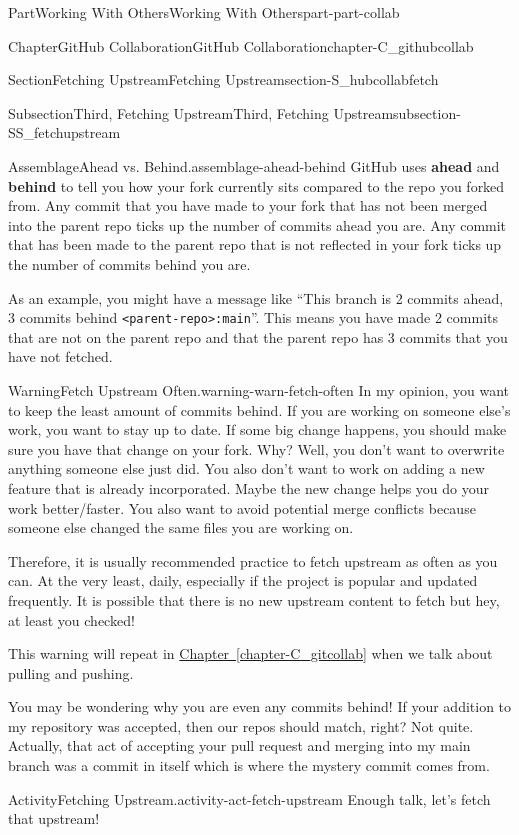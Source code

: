 \documentclass[oneside,10pt,]{book}
\newcommand{\xreffont}{\relax}
\newcommand{\mono}[1]{\texttt{#1}}
\newcommand{\terminology}[1]{\textbf{#1}}
\begin{document}
\begin{partptx}{Part}{Working With Others}{}{Working With Others}{}{}{part-part-collab}
\begin{chapterptx}{Chapter}{GitHub Collaboration}{}{GitHub Collaboration}{}{}{chapter-C_githubcollab}
\begin{sectionptx}{Section}{Fetching Upstream}{}{Fetching Upstream}{}{}{section-S_hubcollabfetch}
\begin{subsectionptx}{Subsection}{Third, Fetching Upstream}{}{Third, Fetching Upstream}{}{}{subsection-SS_fetchupstream}
\begin{assemblage}{Assemblage}{Ahead vs. Behind.}{assemblage-ahead-behind}%
GitHub uses \terminology{ahead} and \terminology{behind} to tell you how your fork currently sits compared to the repo you forked from. Any commit that you have made to your fork that has not been merged into the parent repo ticks up the number of commits ahead you are. Any commit that has been made to the parent repo that is not reflected in your fork ticks up the number of commits behind you are.%
\par
As an example, you might have a message like ``This branch is 2 commits ahead, 3 commits behind \mono{<parent-repo>:main}''. This means you have made 2 commits that are not on the parent repo and that the parent repo has 3 commits that you have not fetched.%
\end{assemblage}
\begin{warning}{Warning}{Fetch Upstream Often.}{warning-warn-fetch-often}%
In my opinion, you want to keep the least amount of commits behind. If you are working on someone else's work, you want to stay up to date. If some big change happens, you should make sure you have that change on your fork. Why? Well, you don't want to overwrite anything someone else just did. You also don't want to work on adding a new feature that is already incorporated. Maybe the new change helps you do your work better\slash{}faster. You also want to avoid potential merge conflicts because someone else changed the same files you are working on.%
\par
Therefore, it is usually recommended practice to fetch upstream as often as you can. At the very least, daily, especially if the project is popular and updated frequently. It is possible that there is no new upstream content to fetch but hey, at least you checked!%
\par
This warning will repeat in \hyperref[chapter-C_gitcollab]{Chapter~{\xreffont\ref{chapter-C_gitcollab}}} when we talk about pulling and pushing.%
\end{warning}
You may be wondering why you are even any commits behind! If your addition to my repository was accepted, then our repos should match, right? Not quite. Actually, that act of accepting your pull request and merging into my main branch was a commit in itself which is where the mystery commit comes from.%
\begin{activity}{Activity}{Fetching Upstream.}{activity-act-fetch-upstream}%
Enough talk, let's fetch that upstream!%
\begin{enumerate}[font=\bfseries,label=(\alph*),ref=\alph*]%

\end{enumerate}
\end{activity}
\end{subsectionptx}
\end{sectionptx}
\end{chapterptx}
\end{partptx}
\end{document}
